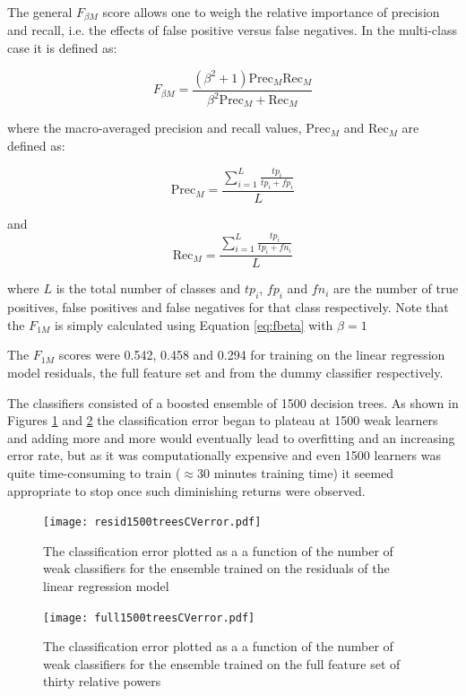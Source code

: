The general $F_{\beta M}$ score allows one to weigh the relative importance of precision and recall, i.e. the effects of false positive versus false negatives. In the multi-class case it is defined as:

\begin{equation}
F_{\beta M} = \frac{(\beta^2 +1) \textrm{Prec}_M \textrm{Rec}_M}{\beta^2 \textrm{Prec}_M + \textrm{Rec}_M}
\label{eq:fbeta}
\end{equation}

where the macro-averaged precision and recall values, $\textrm{Prec}_M$ and $\textrm{Rec}_M$ are defined as:

\begin{equation}
\textrm{Prec}_M = \frac{\sum\limits^{L}_{i=1} \frac{tp_i}{tp_i +fp_i}}{L}
\end{equation}

and
\begin{equation}
\textrm{Rec}_M = \frac{\sum\limits^{L}_{i=1} \frac{tp_i}{tp_i +fn_i}}{L}
\end{equation}

where $L$ is the total number of classes and $tp_i$, $fp_i$ and $fn_i$ are the number of true positives, false positives and false negatives for that class respectively. Note that the $F_{1M}$ is simply calculated using Equation \ref{eq:fbeta} with $\beta = 1$


The $F_{1M}$ scores were 0.542, 0.458 and 0.294 for training on the linear regression model residuals, the full feature set and from the dummy classifier respectively. 

The classifiers consisted of a boosted ensemble of 1500 decision trees. As shown in Figures \ref{fig:resid1500treesCVerror} and \ref{fig:full1500treesCVerror} the classification error began to plateau at 1500 weak learners and adding more and more would eventually lead to overfitting and an increasing error rate, but as it was computationally expensive and even 1500 learners was quite time-consuming to train ($\approx30$ minutes training time) it seemed appropriate to stop once such diminishing returns were observed.



\begin{figure}[h!]
  \centering
    \texttt{[image: resid1500treesCVerror.pdf]}
    \caption{The classification error plotted as a a function of the number of weak classifiers for the ensemble trained on the residuals of the linear regression model}
    \label{fig:resid1500treesCVerror}
\end{figure}



\begin{figure}[h!]
  \centering
    \texttt{[image: full1500treesCVerror.pdf]}
    \caption{The classification error plotted as a a function of the number of weak classifiers for the ensemble trained on the full feature set of thirty relative powers}
    \label{fig:full1500treesCVerror}
\end{figure}



